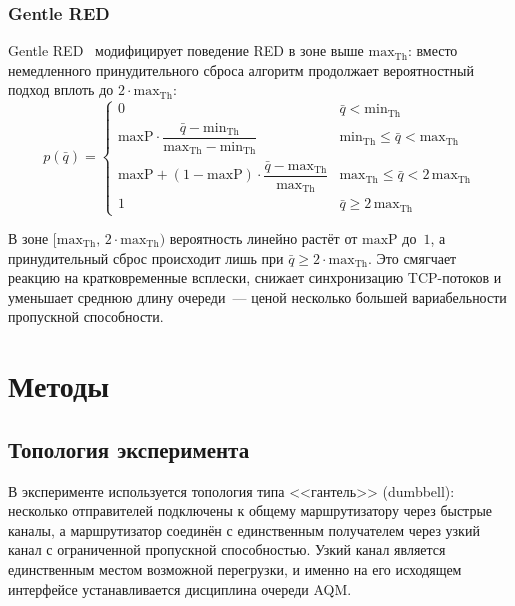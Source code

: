 \documentclass[12pt,a4paper]{article}
\begin{document}
\subsubsection{Gentle RED}

Gentle RED~\cite{floyd2000} модифицирует поведение RED в зоне выше $\mathrm{max}_{\mathrm{Th}}$: вместо немедленного принудительного сброса алгоритм продолжает вероятностный подход вплоть до $2 \cdot \mathrm{max}_{\mathrm{Th}}$:
\begin{equation}
p(\bar{q}) = \begin{cases}
0 & \bar{q} < \mathrm{min}_{\mathrm{Th}} \\[4pt]
\mathrm{maxP} \cdot \dfrac{\bar{q} - \mathrm{min}_{\mathrm{Th}}}{\mathrm{max}_{\mathrm{Th}} - \mathrm{min}_{\mathrm{Th}}}
  & \mathrm{min}_{\mathrm{Th}} \le \bar{q} < \mathrm{max}_{\mathrm{Th}} \\[8pt]
\mathrm{maxP} + (1 - \mathrm{maxP}) \cdot \dfrac{\bar{q} - \mathrm{max}_{\mathrm{Th}}}{\mathrm{max}_{\mathrm{Th}}}
  & \mathrm{max}_{\mathrm{Th}} \le \bar{q} < 2\,\mathrm{max}_{\mathrm{Th}} \\[4pt]
1 & \bar{q} \ge 2\,\mathrm{max}_{\mathrm{Th}}
\end{cases}
\end{equation}

В зоне $[\mathrm{max}_{\mathrm{Th}},\, 2\cdot\mathrm{max}_{\mathrm{Th}})$ вероятность линейно растёт от $\mathrm{maxP}$ до~$1$, а принудительный сброс происходит лишь при $\bar{q} \ge 2\cdot\mathrm{max}_{\mathrm{Th}}$. Это смягчает реакцию на кратковременные всплески, снижает синхронизацию TCP-потоков и уменьшает среднюю длину очереди~--- ценой несколько большей вариабельности пропускной способности.

\section{Методы}
\label{sec:methods}

\subsection{Топология эксперимента}

В эксперименте используется топология типа <<гантель>> (dumbbell): несколько отправителей подключены к общему маршрутизатору через быстрые каналы, а маршрутизатор соединён с единственным получателем через узкий канал с ограниченной пропускной способностью. Узкий канал является единственным местом возможной перегрузки, и именно на его исходящем интерфейсе устанавливается дисциплина очереди AQM.
\end{document}

